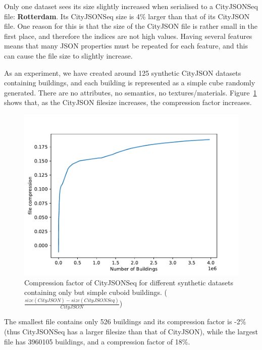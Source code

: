 \documentclass{isprs} %
\begin{document}
%

Only one dataset sees its size slightly increased when serialised to a CityJSONSeq file: \textbf{Rotterdam}.
Its CityJSONSeq size is 4\% larger than that of its CityJSON file.
One reason for this is that the size of the CityJSON file is rather small in the first place, and therefore the indices are not high values.
Having several features means that many JSON properties must be repeated for each feature, and this can cause the file size to slightly increase.

%

As an experiment, we have created around 125 synthetic CityJSON datasets containing buildings, and each building is represented as a simple cube randomly generated.
There are no attributes, no semantics, no textures/materials. 
Figure~\ref{fig:synthetic_compression} shows that, as the CityJSON filesize increases, the compression factor increases.
\begin{figure}
  \centering
  \includegraphics[width=\linewidth]{figs/synthetic_compression.pdf}
  \caption{Compression factor of CityJSONSeq for different synthetic datasets containing only but simple cuboid buildings. ($\frac{size(CityJSON) - size(CityJSONSeq)}{CityJSON}$)}%
\label{fig:synthetic_compression}
\end{figure}
The smallest file contains only 526 buildings and its compression factor is -2\% (thus CityJSONSeq has a larger filesize than that of CityJSON), while the largest file has \num{3960105} buildings, and a compression factor of 18\%.

%

\end{document}
